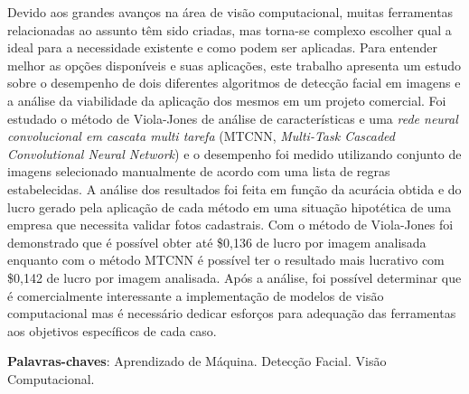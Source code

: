 
\setlength{\absparsep}{18pt} %
\begin{resumo}
  Devido aos grandes avanços na área de visão computacional, muitas ferramentas relacionadas ao assunto têm sido criadas, mas torna-se complexo escolher qual a ideal para a necessidade existente e como podem ser aplicadas. Para entender melhor as opções disponíveis e suas aplicações, este trabalho apresenta um estudo sobre o desempenho de dois diferentes algoritmos de detecção facial em imagens e a análise da viabilidade da aplicação dos mesmos em um projeto comercial. Foi estudado o método de Viola-Jones de análise de características e uma \textit{rede neural convolucional em cascata multi tarefa} (MTCNN, \textit{Multi-Task Cascaded Convolutional Neural Network}) e o desempenho foi medido utilizando conjunto de imagens selecionado manualmente de acordo com uma lista de regras estabelecidas. A análise dos resultados foi feita em função da acurácia obtida e do lucro gerado pela aplicação de cada método em uma situação hipotética de uma empresa que necessita validar fotos cadastrais. Com o método de Viola-Jones foi demonstrado que é possível obter até \$0,136 de lucro por imagem analisada enquanto com o método MTCNN é possível ter o resultado mais lucrativo com \$0,142 de lucro por imagem analisada. Após a análise, foi possível determinar que é comercialmente interessante a implementação de modelos de visão computacional mas é necessário dedicar esforços para adequação das ferramentas aos objetivos específicos de cada caso.

  \textbf{Palavras-chaves}: Aprendizado de Máquina. Detecção Facial. Visão Computacional.
\end{resumo}


